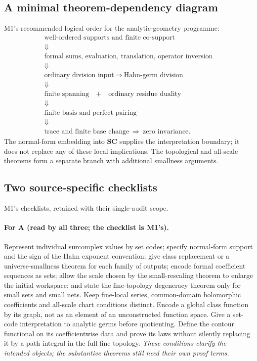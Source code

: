 \documentclass[11pt,letterpaper]{article}
\numberwithin{equation}{section}
\theoremstyle{definition}
\theoremstyle{remark}
\newcommand{\SC}{\mathbf{SC}}
\begin{document}
\subsection{A minimal theorem-dependency diagram}
\label{found:app:diagram}
M1's recommended logical order for the analytic-geometry programme:
\[
\begin{gathered}
\text{well-ordered supports and finite co-support}\\
\Downarrow\\
\text{formal sums, evaluation, translation, operator inversion}\\
\Downarrow\\
\text{ordinary division input}\ \Longrightarrow\ \text{Hahn-germ division}\\
\Downarrow\\
\text{finite spanning}\quad+\quad\text{ordinary residue duality}\\
\Downarrow\\
\text{finite basis and perfect pairing}\\
\Downarrow\\
\text{trace and finite base change}\ \Longrightarrow\ \text{zero invariance}.
\end{gathered}
\]
The normal-form embedding into $\SC$ supplies the interpretation boundary; it
does not replace any of these local implications. The topological and all-scale
theorems form a separate branch with additional smallness arguments.

\subsection{Two source-specific checklists}
\label{found:app:checklists}
M1's checklists, retained with their single-audit scope.

\paragraph{For A (read by all three; the checklist is M1's).} Represent
individual surcomplex values by set codes; specify normal-form support and the
sign of the Hahn exponent convention; give class replacement or a
universe-smallness theorem for each family of outputs; encode formal coefficient
sequences as sets; allow the scale chosen by the small-rescaling theorem to
enlarge the initial workspace; and state the fine-topology degeneracy theorem
only for small sets and small nets. Keep fine-local series, common-domain
holomorphic coefficients and all-scale chart conditions distinct. Encode a
global class function by its graph, not as an element of an unconstructed
function space. Give a set-code interpretation to analytic germs before
quotienting. Define the contour functional on its coefficientwise data and prove
its laws without silently replacing it by a path integral in the full fine
topology. \emph{These conditions clarify the intended objects; the substantive
theorems still need their own proof terms.}
\end{document}
